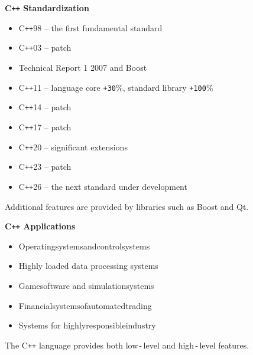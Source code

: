 \documentclass{beamer}
\begin{document}
\begin{frame}{\bf C\texttt{++} Standardization}

    \begin{itemize}

        \item C\texttt{++}98 -- the first fundamental standard

        \item C\texttt{++}03 -- patch

        \item Technical Report 1 2007 and Boost

        \item C\texttt{++}11 -- language core \texttt{+30}\%, standard library \texttt{+100}\%

        \item C\texttt{++}14 -- patch

        \item C\texttt{++}17 -- patch

        \item C\texttt{++}20 -- significant extensions

        \item C\texttt{++}23 -- patch

        \item C\texttt{++}26 -- the next standard under development
         
    \end{itemize}

    \begin{block}
    \justifying Additional features are provided by libraries such as Boost and Qt.
    \end{block}
    
\end{frame}

\begin{frame}{\bf C\texttt{++} Applications}
    
    \begin{itemize}

        \item Operating\:systems\;and\;control\:systems

        \item Highly loaded data processing systems

        \item Game\;software and simulation\;systems

        \item Financial\:systems\:of\:automated\:trading

        \item Systems for highly\;responsible\;industry
        
    \end{itemize}

    \begin{block}
    \justifying The C\texttt{++} language provides both low\,-\,level and high\,-\,level features.
    \end{block}
    
\end{frame}
\end{document}
